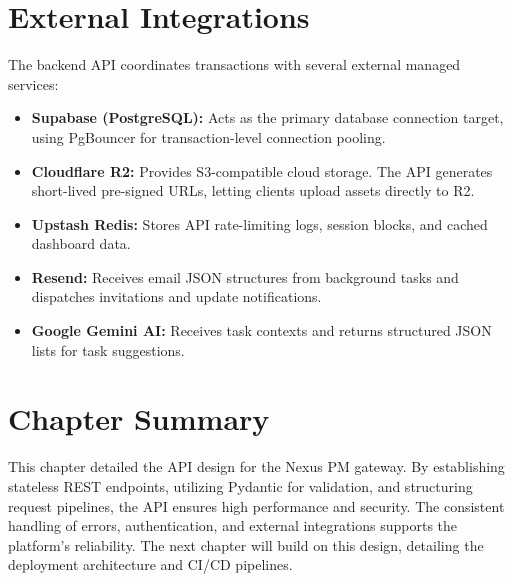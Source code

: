 \section{External Integrations}
The backend API coordinates transactions with several external managed services:
\begin{itemize}
    \item \textbf{Supabase (PostgreSQL):} Acts as the primary database connection target, using PgBouncer for transaction-level connection pooling.
    \item \textbf{Cloudflare R2:} Provides S3-compatible cloud storage. The API generates short-lived pre-signed URLs, letting clients upload assets directly to R2.
    \item \textbf{Upstash Redis:} Stores API rate-limiting logs, session blocks, and cached dashboard data.
    \item \textbf{Resend:} Receives email JSON structures from background tasks and dispatches invitations and update notifications.
    \item \textbf{Google Gemini AI:} Receives task contexts and returns structured JSON lists for task suggestions.
\end{itemize}

\section{Chapter Summary}
This chapter detailed the API design for the Nexus PM gateway. By establishing stateless REST endpoints, utilizing Pydantic for validation, and structuring request pipelines, the API ensures high performance and security. The consistent handling of errors, authentication, and external integrations supports the platform's reliability. The next chapter will build on this design, detailing the deployment architecture and CI/CD pipelines.

